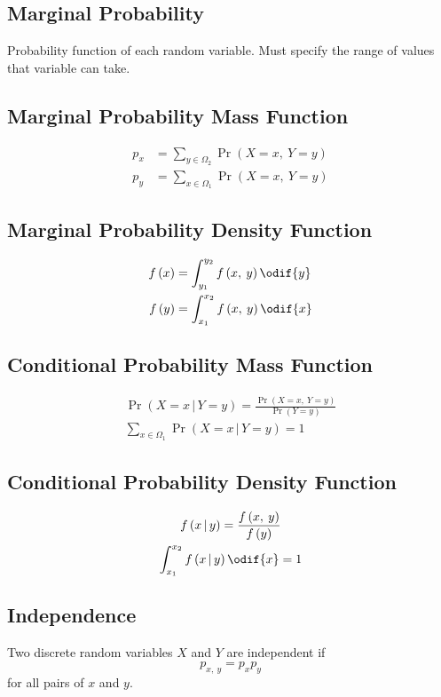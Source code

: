\documentclass{article}
\begin{document}
\begin{multicols}{3}
    \subsection{Marginal Probability}
    Probability function of each random variable. Must specify the
    range of values that variable can take.
    \subsection{Marginal Probability Mass Function}
    \begin{align*}
        p_x & = \sum_{y \in \Omega_2} \Pr{\left( X = x,\: Y = y \right)} \\
        p_y & = \sum_{x \in \Omega_1} \Pr{\left( X = x,\: Y = y \right)}
    \end{align*}
    \subsection{Marginal Probability Density Function}
    \begin{align*}
        f\left( x \right) & = \int_{y_1}^{y_2} f\left( x,\: y \right) \odif{y} \\
        f\left( y \right) & = \int_{x_1}^{x_2} f\left( x,\: y \right) \odif{x}
    \end{align*}
    \subsection{Conditional Probability Mass Function}
    \begin{gather*}
        \Pr{\left( X = x \,\vert\, Y = y \right)} = \frac{\Pr{\left( X = x,\: Y = y \right)}}{\Pr{\left( Y = y \right)}} \\
        \sum_{x \in \Omega_1} \Pr{\left( X = x \,\vert\, Y = y \right)} = 1
    \end{gather*}
    \subsection{Conditional Probability Density Function}
    \begin{gather*}
        f\left( x \,\vert\, y \right) = \frac{f\left( x,\: y \right)}{f\left( y \right)} \\
        \int_{x_1}^{x_2} f\left( x \,\vert\, y \right) \odif{x} = 1
    \end{gather*}
    \subsection{Independence}
    Two discrete random variables \(X\) and \(Y\) are independent if
    \begin{equation*}
        p_{x,\:y} = p_x p_y
    \end{equation*}
    for all pairs of \(x\) and \(y\).


\end{multicols}
\end{document}

